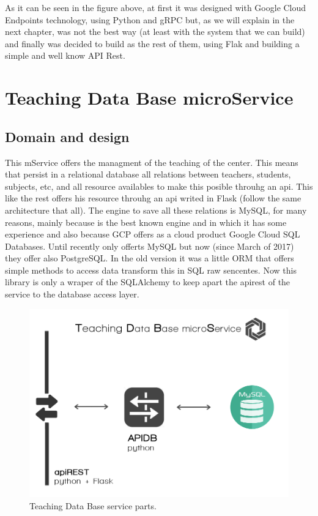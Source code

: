\noindent As it can be seen in the figure above, at first it was designed with Google Cloud
Endpoints technology, using Python and gRPC but, as we will explain in the next
chapter, was not the best way (at least with the system that we can build) and
finally was decided to build as the rest of them, using Flak and building a
simple and well know API Rest.


\section{Teaching Data Base microService}

\subsection{Domain and design}

This mService offers the managment of the teaching of the center.
This means that persist in a relational database all relations between
teachers, students, subjects, etc, and all resource availables to
make this posible throuhg an api.
\intro
This like the rest offers his resource throuhg an api writed in Flask
(follow the same architecture that all).
\intro
The engine to save all these relations is MySQL, for many reasons,
mainly because is the best known engine and in which it has some experience
and also because GCP offers as a cloud product Google Cloud SQL Databases.
Until recently only offerts MySQL but now (since March of 2017) they
offer also PostgreSQL.
\intro
In the old version it was a little ORM that offers simple methods
to access data transform this in SQL raw sencentes. Now this library
is only a wraper of the SQLAlchemy to keep apart the apirest of the
service to the database access layer.

\begin{figure}[H]
  \includegraphics[scale=0.35]{img/graphics/tdbms.png}
  \centering
  \caption{Teaching Data Base service parts.}
\end{figure}


